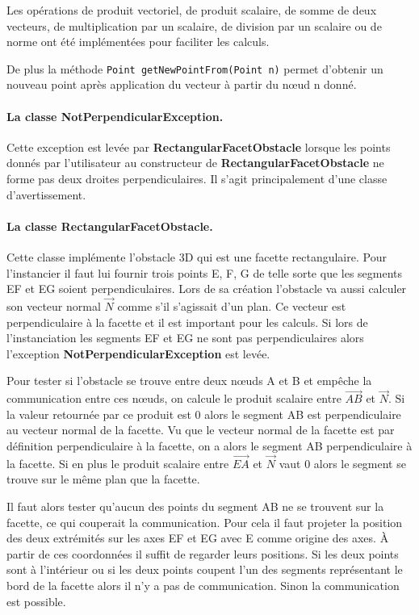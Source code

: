 \documentclass{article}
\begin{document}
Les opérations de produit vectoriel, de produit scalaire, de somme de deux vecteurs, de multiplication par un scalaire, de division par un scalaire ou de norme ont été implémentées pour faciliter les calculs.\medskip
 
De plus la méthode \texttt{Point getNewPointFrom(Point n)} permet d'obtenir un nouveau point après application du vecteur à partir du n\oe ud n donné.

\paragraph{La classe NotPerpendicularException.}

Cette exception est levée par \textbf{RectangularFacet\-Obstacle} lorsque les points donnés par l'utilisateur au constructeur de \textbf{RectangularFacetObstacle} ne forme pas deux droites perpendiculaires. Il s'agit principalement d'une classe d'avertissement.

\paragraph{La classe RectangularFacetObstacle.}

Cette classe implémente l'obstacle 3D qui est une facette rectangulaire. Pour l'instancier il faut lui fournir trois points E, F, G de telle sorte que les segments EF et EG soient perpendiculaires. Lors de sa création l'obstacle va aussi calculer son vecteur normal $\overrightarrow{N}$ comme s'il s'agissait d'un plan. Ce vecteur est perpendiculaire à la facette et il est important pour les calculs.
Si lors de l'instanciation les segments EF et EG ne sont pas perpendiculaires alors l'exception  \textbf{NotPerpendicularException} est levée.\medskip

Pour tester si l'obstacle se trouve entre deux n\oe uds A et B et empêche la communication entre ces n\oe uds, on calcule le produit scalaire entre $\overrightarrow{AB}$ et $\overrightarrow{N}$. Si la valeur retournée par ce produit est 0 alors le segment AB est perpendiculaire au vecteur normal de la facette. Vu que le vecteur normal de la facette est par définition perpendiculaire à la facette, on a alors le segment AB perpendiculaire à la facette. Si en plus le produit scalaire entre $\overrightarrow{EA}$ et $\overrightarrow{N}$ vaut 0 alors le segment se trouve sur le même plan que la facette.\medskip

Il faut alors tester qu'aucun des points du segment AB ne se trouvent sur la facette, ce qui couperait la communication. Pour cela il faut projeter la position des deux extrémités sur les axes EF et EG avec E comme origine des axes. À partir de ces coordonnées il suffit de regarder leurs positions. Si les deux points sont à l'intérieur ou si les deux points coupent l'un des segments représentant le bord de la facette alors il n'y a pas de communication. Sinon la communication est possible.\medskip
\end{document}
